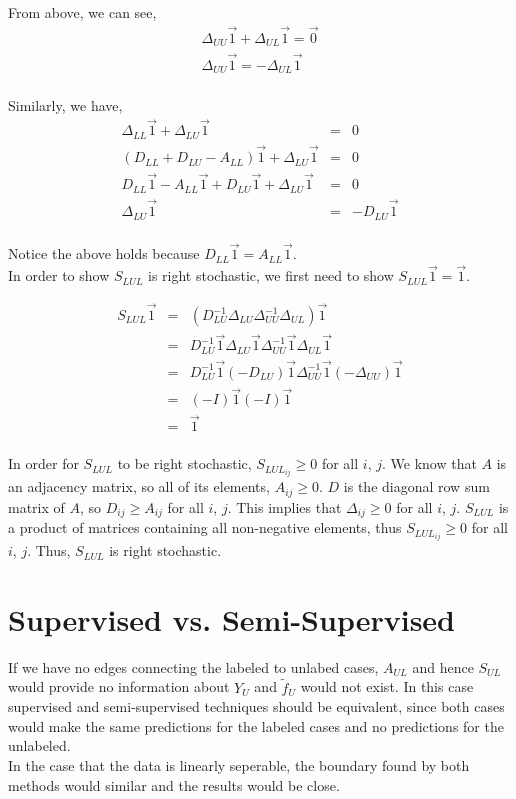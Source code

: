 \documentclass[a4paper]{article}
\begin{document}
From above, we can see,
\begin{eqnarray}
\Delta_{UU}\vec{1} + \Delta_{UL}\vec{1} = \vec{0} \nonumber \\
\Delta_{UU}\vec{1} = -\Delta_{UL}\vec{1} \nonumber 
\end{eqnarray} \\
Similarly, we have,
\begin{eqnarray}
\Delta_{LL}\vec{1} + \Delta_{LU}\vec{1} &=& 0 \nonumber \\
\left(D_{LL} + D_{LU} - A_{LL}\right)\vec{1} + \Delta_{LU}\vec{1} &=& 0 \nonumber \\
D_{LL}\vec{1} - A_{LL}\vec{1} + D_{LU}\vec{1} + \Delta_{LU}\vec{1} &=& 0 \nonumber \\
\Delta_{LU}\vec{1} &=& -D_{LU}\vec{1} \nonumber 
\end{eqnarray}\\
Notice the above holds because $D_{LL}\vec{1} = A_{LL}\vec{1}$.\\

In order to show $S_{LUL}$ is right stochastic, we first need to
show $S_{LUL}\vec{1} = \vec{1}$.

\begin{eqnarray}
S_{LUL}\vec{1} & = & \left(D_{LU}^{-1}\Delta_{LU}\Delta_{UU}^{-1}\Delta_{UL}\right)\vec{1} \nonumber \\
& = & D_{LU}^{-1}\vec{1}\Delta_{LU}\vec{1}\Delta_{UU}^{-1}\vec{1}\Delta_{UL}\vec{1} \nonumber \\
& = &
D_{LU}^{-1}\vec{1}\left(-D_{LU}\right)\vec{1}\Delta_{UU}^{-1}\vec{1}\left(-\Delta_{UU}\right)\vec{1}
\nonumber \\ 
& = & \left(-I\right)\vec{1}\left(-I\right)\vec{1} \nonumber \\
& = & \vec{1} 
\end{eqnarray}\\
In order for $S_{LUL}$ to be right stochastic, $S_{LUL_{ij}} \geq
0$ for all $i$, $j$. We know that $A$ is an adjacency matrix, so all
of its elements, $A_{ij} \geq 0$. $D$ is the diagonal row sum matrix
of $A$, so $D_{ij} \geq A_{ij}$ for all $i$, $j$. This implies that
$\Delta_{ij} \geq 0$ for all $i$, $j$. $S_{LUL}$ is a product of
matrices containing all non-negative elements, thus $S_{LUL_{ij}} \geq
0$ for all $i$, $j$. Thus, $S_{LUL}$ is right stochastic.  


\section{Supervised vs. Semi-Supervised}
If we have no edges connecting the labeled to unlabed cases, $A_{UL}$
and hence $S_{UL}$ would provide no information about $Y_U$ and
$\widetilde{f}_U$ would not exist.  In this
case supervised and semi-supervised techniques should be equivalent,
since both cases would make the same predictions for the labeled cases and
no predictions for the unlabeled.\\

In the case that the data is linearly seperable, the boundary found by
both methods would similar and the results would be close.
\end{document}
